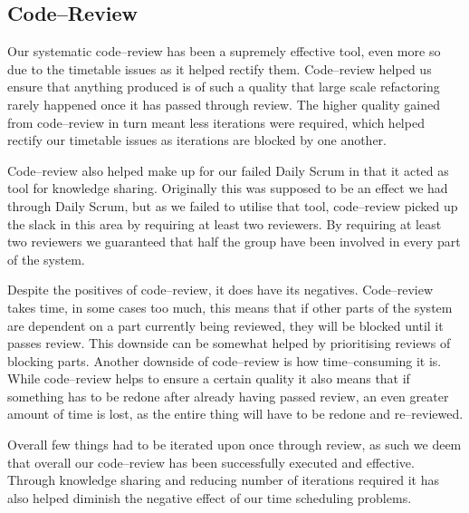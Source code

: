 \subsection{Code--Review}
Our systematic code--review has been a supremely effective tool, even more so due to the timetable issues as it helped rectify them.
Code--review helped us ensure that anything produced is of such a quality that large scale refactoring rarely happened once it has passed through review.
The higher quality gained from code--review in turn meant less iterations were required, which helped rectify our timetable issues as iterations are blocked by one another.

Code--review also helped make up for our failed Daily Scrum in that it acted as tool for knowledge sharing.
Originally this was supposed to be an effect we had through Daily Scrum, but as we failed to utilise that tool, code--review picked up the slack in this area by requiring at least two reviewers.
By requiring at least two reviewers we guaranteed that half the group have been involved in every part of the system.

\bigskip
Despite the positives of code--review, it does have its negatives.
Code--review takes time, in some cases too much, this means that if other parts of the system are dependent on a part currently being reviewed, they will be blocked until it passes review.
This downside can be somewhat helped by prioritising reviews of blocking parts.
Another downside of code--review is how time--consuming it is.
While code--review helps to ensure a certain quality it also means that if something has to be redone after already having passed review, an even greater amount of time is lost, as the entire thing will have to be redone and re--reviewed.

Overall few things had to be iterated upon once through review, as such we deem that overall our code--review has been successfully executed and effective.
Through knowledge sharing and reducing number of iterations required it has also helped diminish the negative effect of our time scheduling problems.
